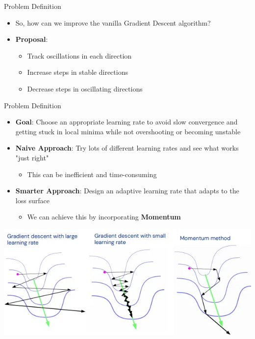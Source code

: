 \documentclass[serif, aspectratio=169]{beamer}
\begin{document}
\begin{frame}{Problem Definition}
    \begin{itemize}
        \item So, how can we improve the vanilla Gradient Descent algorithm? 
        \item \textbf{Proposal}:
        \begin{itemize}
            \item Track oscillations in each direction
            \item Increase steps in stable directions
            \item Decrease steps in oscillating directions
        \end{itemize}
    \end{itemize}
\end{frame}


\begin{frame}{Problem Definition}
    \begin{itemize}
        \item \textbf{Goal}: Choose an appropriate learning rate to avoid slow convergence and getting stuck in local minima while not overshooting or becoming unstable
        \item \textbf{Naive Approach}: Try lots of different learning rates and see what works "just right"
        \begin{itemize}
            \item This can be inefficient and time-consuming
        \end{itemize}
        \item \textbf{Smarter Approach}: Design an adaptive learning rate that adapts to the loss surface
        \begin{itemize}
            \item We can achieve this by incorporating \textbf{Momentum}
        \end{itemize}
    \end{itemize}
    \vfill
    \begin{center}
        \includegraphics[width=0.6\linewidth]{pic/compare_momentum.png}
    \end{center}
\end{frame}
\end{document}
